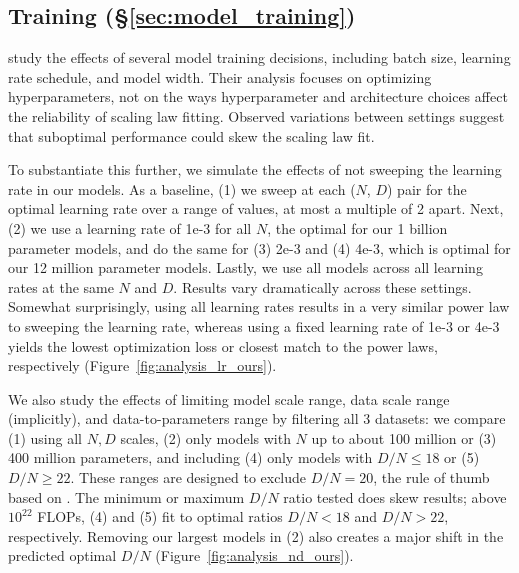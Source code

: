 


\subsection{Training (\S\ref{sec:model_training})} \label{sec:repl-model_training}

\citet{hu2024minicpm} study the effects of several model training decisions, including batch size, learning rate schedule, and model width. Their analysis focuses on optimizing hyperparameters, not on the ways hyperparameter and architecture choices affect the reliability of scaling law fitting. Observed variations between settings suggest that suboptimal performance could skew the scaling law fit. 

To substantiate this further, we simulate the effects of not sweeping the learning rate in our models. As a baseline, (1) we sweep at each ($N$, $D$) pair for the optimal learning rate over a range of values, at most a multiple of 2 apart. Next, (2) we use a learning rate of 1e-3 for all $N$, the optimal for our 1 billion parameter models, and do the same for (3) 2e-3 and (4) 4e-3, which is optimal for our 12 million parameter models. Lastly, we use all models across all learning rates at the same $N$ and $D$. Results vary dramatically across these settings. Somewhat surprisingly, using all learning rates results in a very similar power law to sweeping the learning rate, whereas using a fixed learning rate of 1e-3 or 4e-3 yields the lowest optimization loss or closest match to the \citet{hoffmann2022training} power laws, respectively (Figure~\ref{fig:analysis_lr_ours}).

We also study the effects of limiting model scale range, data scale range (implicitly), and data-to-parameters range by filtering all 3 datasets: we compare (1) using all $N, D$ scales, (2) only models with $N$ up to about 100 million or (3) 400 million parameters, and including (4) only models with $D/N \leq 18$ or (5) $D/N \geq 22$. These ranges are designed to exclude $D/N = 20$, the rule of thumb based on \citet{hoffmann2022training}. The minimum or maximum $D/N$ ratio tested does skew results; above $10^{22}$ FLOPs, (4) and (5) fit to optimal ratios $D/N < 18$ and $D/N > 22$, respectively. Removing our largest models in (2) also creates a major shift in the predicted optimal $D/N$ (Figure~\ref{fig:analysis_nd_ours}).


